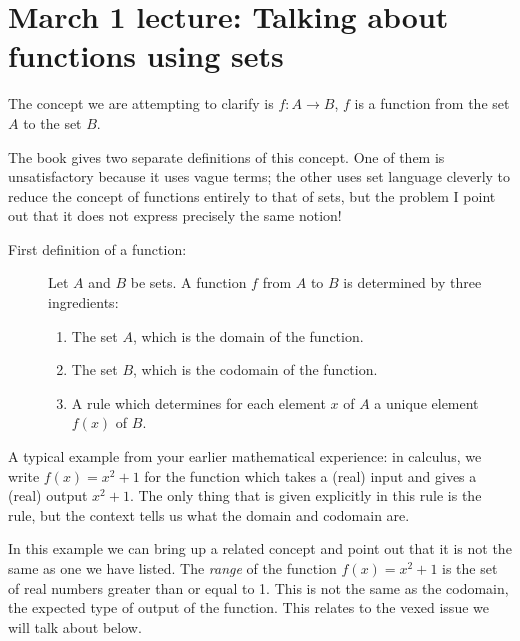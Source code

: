 \documentclass[12pt]{article}
\begin{document}
\newpage

\section{March 1 lecture:  Talking about functions using sets}

The concept we are attempting to clarify is $f:A \rightarrow B$, $f$ is a function from the set $A$ to the set $B$.

The book gives two separate definitions of this concept.  One of them is unsatisfactory because it uses vague terms;  the other uses set language cleverly to reduce the concept of functions entirely to that of sets, but the problem I point out that it does not express precisely the same notion!

\begin{description}

\item[First definition of a function:]  Let $A$ and $B$ be sets.  A function $f$ from $A$ to $B$ is determined by three ingredients:

\begin{enumerate}

\item  The set $A$, which is the domain of the function.

\item  The set $B$, which is the codomain of the function.

\item A  rule which determines for each element $x$ of $A$ a unique element $f(x)$ of $B$.

\end{enumerate}

\end{description}

A typical example from your earlier mathematical experience:  in calculus, we write $f(x)=x^2+1$ for the function which takes a (real) input and gives a (real) output $x^2+1$.   The only thing that is given explicitly in this rule is the rule, but the context tells us what the domain and codomain are.

In this example we can bring up a related concept and point out that it is not the same as one we have listed.  The {\em range\/} of the function $f(x)=x^2+1$  is the set of real numbers greater than or equal to 1.  This is not the same as the codomain, the expected type of output of the function.  This relates to the vexed issue we will talk about below.
\end{document}
